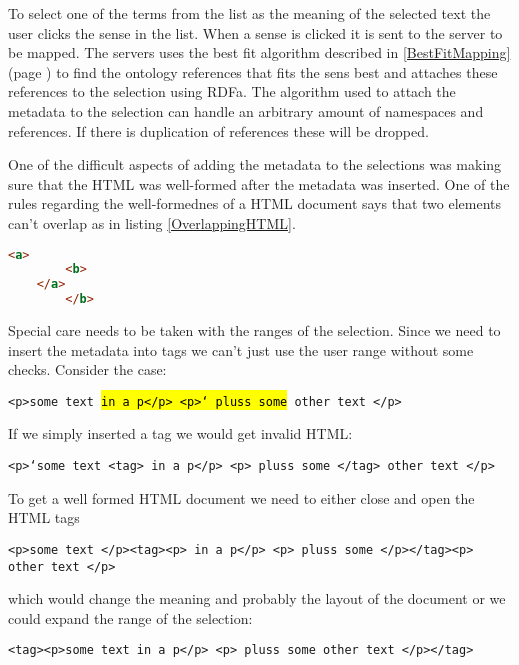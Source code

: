 To select one of the terms from the list as the meaning of the selected text the user clicks the sense in the list.
When a sense is clicked it is sent to the server to be mapped.
The servers uses the best fit algorithm described in \ref{BestFitMapping}(page \pageref{BestFitMapping}) to find the ontology references
that fits the sens best and attaches these references to the selection using RDFa.
The algorithm used to attach the metadata to the selection can handle an arbitrary amount of namespaces and references.
If there is duplication of references these will be dropped.

One of the difficult aspects of adding the metadata to the selections was making sure that the HTML was well-formed
after the metadata was inserted.
One of the rules regarding the well-formednes of a HTML document says that two elements can't overlap as in listing \ref{OverlappingHTML}.

\begin{lstlisting}[language=HTML, caption=Example of overlapping elements, label=OverlappingHTML]
	<a>
		<b>
	</a>
		</b>
\end{lstlisting}
Special care needs to be taken with the ranges of the selection.
Since we need to insert the metadata into tags we can't just use the user range without some checks.
Consider the case:

\texttt{<p>some text \hl{in a p</p> <p>` pluss some} other text </p>}

If we simply inserted a tag we would get invalid HTML:

\texttt{<p>`some text <tag> in a p</p> <p> pluss some </tag>  other text </p>}

To get a well formed HTML document we need to either close and open the HTML tags

\texttt{<p>some text </p><tag><p> in a p</p> <p> pluss some </p></tag><p>  other text </p>}

which would change the meaning and probably the layout of the document or we could expand the range of the selection:

\texttt{<tag><p>some text in a p</p> <p> pluss some   other text </p></tag>}



